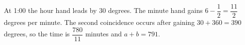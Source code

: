 At 1:00 the hour hand leads by 30 degrees. The minute hand gains $6-\dfrac{1}{2}=\dfrac{11}{2}$ degrees per minute. The second coincidence occurs after gaining $30+360=390$ degrees, so the time is $\dfrac{780}{11}$ minutes and $\boxed{a+b=791}$.
